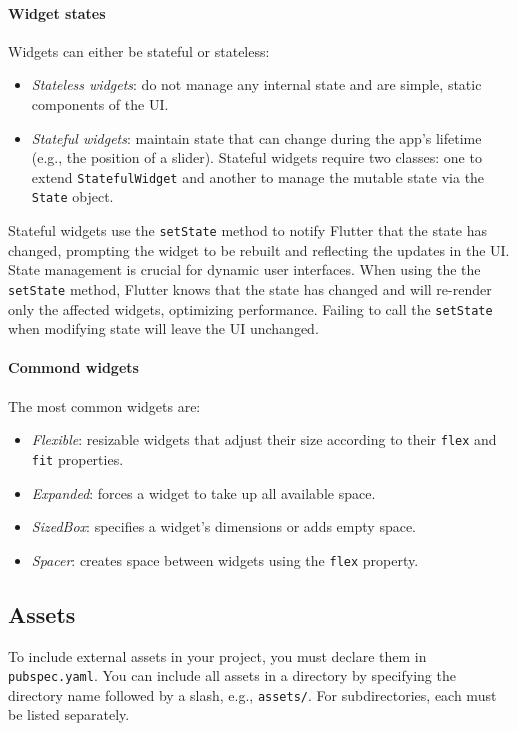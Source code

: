 \paragraph*{Widget states}
Widgets can either be stateful or stateless:
\begin{itemize}
    \item \textit{Stateless widgets}: do not manage any internal state and are simple, static components of the UI.
    \item \textit{Stateful widgets}: maintain state that can change during the app's lifetime (e.g., the position of a slider). 
        Stateful widgets require two classes: one to extend \texttt{StatefulWidget} and another to manage the mutable state via the \texttt{State} object.
\end{itemize}
Stateful widgets use the \texttt{setState} method to notify Flutter that the state has changed, prompting the widget to be rebuilt and reflecting the updates in the UI.
State management is crucial for dynamic user interfaces.
When using the the \texttt{setState} method, Flutter knows that the state has changed and will re-render only the affected widgets, optimizing performance. 
Failing to call the \texttt{setState} when modifying state will leave the UI unchanged.

\paragraph*{Commond widgets}
The most common widgets are:
\begin{itemize}
    \item \textit{Flexible}: resizable widgets that adjust their size according to their \texttt{flex} and \texttt{fit} properties.
    \item \textit{Expanded}: forces a widget to take up all available space.
    \item \textit{SizedBox}: specifies a widget's dimensions or adds empty space.
    \item \textit{Spacer}: creates space between widgets using the \texttt{flex} property.
\end{itemize}

\subsection{Assets}
To include external assets in your project, you must declare them in \texttt{pubspec.yaml}. 
You can include all assets in a directory by specifying the directory name followed by a slash, e.g., \texttt{assets/}. 
For subdirectories, each must be listed separately.

